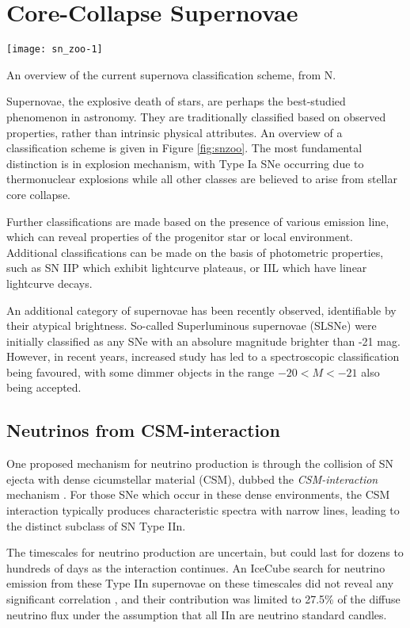 \section{Core-Collapse Supernovae}
\label{sec:ccsn}

\begin{marginfigure}
	\texttt{[image: sn\_zoo-1]}
	\caption{An overview of the current supernova classification scheme, from N.}
	\label{fig:snzoo}
\end{marginfigure}

Supernovae, the explosive death of stars, are perhaps the best-studied phenomenon in astronomy. They are traditionally classified based on observed properties, rather than intrinsic physical attributes. An overview of a classification scheme is given in Figure \ref{fig:snzoo}. The most fundamental distinction is in explosion mechanism, with Type Ia SNe occurring due to thermonuclear explosions while all other classes are believed to arise from stellar core collapse. 

Further classifications are made based on the presence of various emission line, which can reveal properties of the progenitor star or local environment. Additional classifications can be made on the basis of photometric properties, such as SN IIP which exhibit lightcurve plateaus, or IIL which have linear lightcurve decays. 

An additional category of supernovae has been recently observed, identifiable by their atypical brightness. So-called Superluminous supernovae (SLSNe) were initially classified as any SNe with an absolure magnitude brighter than -21 mag. However, in recent years, increased study has led to a spectroscopic classification being favoured, with some dimmer objects in the range $-20 < M < -21$ also being accepted. 

\subsection{Neutrinos from CSM-interaction}

One proposed mechanism for neutrino production is through the collision of SN ejecta with dense cicumstellar material (CSM), dubbed the \emph{CSM-interaction} mechanism . For those SNe which occur in these dense environments, the CSM interaction typically produces characteristic spectra with narrow lines, leading to the distinct subclass of SN Type IIn. 

The timescales for neutrino production are uncertain, but could last for dozens to hundreds of days as the interaction continues. An IceCube search for neutrino emission from these Type IIn supernovae on these timescales did not reveal any significant correlation , and their contribution was limited to 27.5\%  of the diffuse neutrino flux under the assumption that all IIn are neutrino standard candles. 

